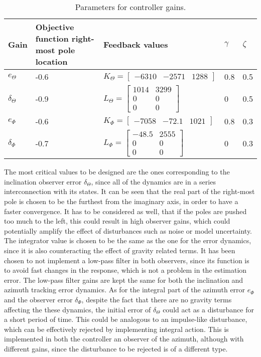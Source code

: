 \documentclass[main.tex]{subfiles}
\begin{document}
\begin{table}[h]
\centering
\caption{Parameters for controller gains.}
\label{table:controllervalues}
\begin{tabular}{|l|l|l|l|l|}
\hline
Gain & Objective function right-most pole location & Feedback values & $\gamma$ & $\zeta$ \\ \hline
$e_\Theta$ & -0.6 & $K_\Theta = \begin{bmatrix} -6310 & -2571 & 1288 \end{bmatrix}$ & 0.8 & 0.5\\ \hline
$\delta_\Theta$ & -0.9 & $L_\Theta = \begin{bmatrix} 1014 & 3299 \\ 0 & 0 \\ 0 & 0\end{bmatrix}$ & 0 & 0.5\\ \hline
$e_\Phi$   & -0.6 & $K_\Phi = \begin{bmatrix} -7058 & -72.1 & 1021 \end{bmatrix}$ & 0.8 & 0.3\\ \hline
$\delta_\Phi$   & -0.7 & $L_\Phi = \begin{bmatrix} -48.5 & 2555 \\ 0 & 0 \\ 0 & 0\end{bmatrix}$ & 0 & 0.3 \\\hline
\end{tabular}
\end{table}

The most critical values to be designed are the ones corresponding to the inclination observer error $\delta_\Theta$, since all of the dynamics are in a series interconnection with its states. It can be seen that the real part of the right-most pole is chosen to be the furthest from the imaginary axis, in order to have a faster convergence. It has to be considered as well, that if the poles are pushed too much to the left, this could result in high observer gains, which could potentially amplify the effect of disturbances such as noise or model uncertainty. The integrator value is chosen to be the same as the one for the error dynamics, since it is also counteracting the effect of gravity related terms. It has been chosen to not implement a low-pass filter in both observers, since its function is to avoid fast changes in the response, which is not a problem in the estimation error. The low-pass filter gains are kept the same for both the inclination and azimuth tracking error dynamics. As for the integral part of the azimuth error $e_\Phi$ and the observer error $\delta_\Phi$, despite the fact that there are no gravity terms affecting the these dynamics, the initial error of $\delta_\Theta$ could act as a disturbance for a short period of time. This could be analogous to an impulse-like disturbance, which can be effectively rejected by implementing integral action. This is implemented in both the controller an observer of the azimuth, although with different gains, since the disturbance to be rejected is of a different type. 
\end{document}
